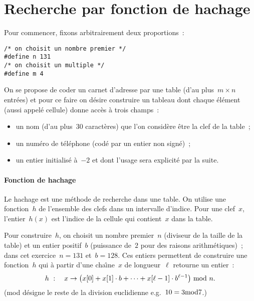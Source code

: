 \section{Recherche par fonction de hachage}
\label{sec:FonctionHachage}
Pour commencer, fixons arbitrairement deux proportions~:
\begin{verbatim}
/* on choisit un nombre premier */
#define n 131
/* on choisit un multiple */
#define m 4
\end{verbatim}
On se propose de coder un carnet d'adresse par une table (d'au
plus~${m \times n}$ entr\'ees) et pour ce faire on d\'esire construire un
tableau dont chaque \'el\'ement (aussi appel\'e cellule) donne acc\`es
\`a trois champs~:
\begin{itemize}
\item un nom (d'au plus~$30$ caract\`eres) que l'on consid\`ere \^etre
  la clef de la table~;
\item un num\'ero de t\'el\'ephone (cod\'e par un entier non
  sign\'e)~;
\item un entier initialis\'e \`a~$-2$ et dont l'usage sera explicit\'e
  par la suite.
\end{itemize}
\paragraph{Fonction de hachage}
Le hachage est une m\'ethode de recherche dans une table. On utilise
une fonction~$h$ de l'ensemble des clefs dans un intervalle d'indice.
Pour une clef~$x$, l'entier~$h(x)$ est l'indice de la cellule qui
contient~$x$ dans la table.  
\par
Pour construire~$h$, on choisit un nombre premier~$n$ (diviseur de la
taille de la table) et un entier positif~$b$ (puissance de~$2$ pour des
raisons arithm\'etiques)~; dans cet exercice~${n=131}$ et~${b=128}$.
Ces entiers permettent de construire une fonction~$h$ qui \`a partir
d'une cha\^\i{}ne~$x$ de longueur~$\ell$ retourne un entier~:
\begin{equation}
  \label{eq:Hachage}
  h~:\quad x \rightarrow \bigl( x[0]+x[1]\cdot b + \cdots + 
x[\ell-1]\cdot b^{\ell-1}\bigr)\ \textup{mod}\ n.
\end{equation}
(mod d\'esigne le reste de la division euclidienne e.g.~${10 = 3 \textup{mod} 7}$.)
